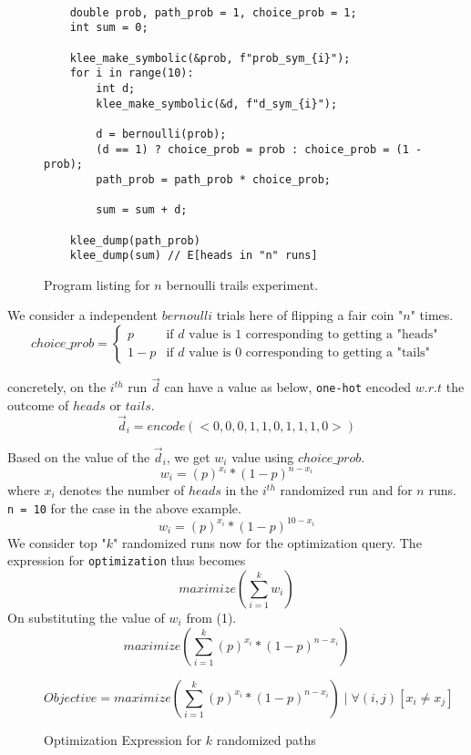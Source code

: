 \documentclass[usenames,dvipsnames,acmsmall]{acmart}
\begin{document}
	\begin{figure}
		\begin{verbatim}
	
	double prob, path_prob = 1, choice_prob = 1;
	int sum = 0;
	
	klee_make_symbolic(&prob, f"prob_sym_{i}");
	for i in range(10):
		int d;
		klee_make_symbolic(&d, f"d_sym_{i}");
	
		d = bernoulli(prob);
		(d == 1) ? choice_prob = prob : choice_prob = (1 - prob);
		path_prob = path_prob * choice_prob;
		
		sum = sum + d;
		
	klee_dump(path_prob)
	klee_dump(sum) // E[heads in "n" runs] 
		\end{verbatim}
		\caption{Program listing for $n$ bernoulli trails experiment.}
	\end{figure}

We consider a independent $bernoulli$ trials here of flipping a fair coin "$n$" times. 
\[ 
{choice\_prob} = 
\begin{cases} 
	p & \textrm{if $d$ value is 1 corresponding to getting a "heads"} \\
	1-p & \textrm{if $d$ value is 0 corresponding to getting a "tails"}
\end{cases}
\]

concretely, on the $i^{th}$ run \texttt{$\vec{d}$} can have a value as below, \texttt{one-hot} encoded $w.r.t$ the outcome of $heads$ or $tails$.
\[
\vec{d}_{i} = encode(<0,0,0,1,1,0,1,1,1,0>)
\]

Based on the value of the $\vec{d}_{i}$, we get $w_{i}$ value using $choice\_prob$. 
\begin{equation}
	w_{i} = {(p)^{x_i} * (1-p)^{n-x_i}}
\end{equation}
where $x_i$ denotes the number of $heads$ in the $i^{th}$ randomized run and for $n$ runs. \texttt{n = 10} for the case in the above example. \\
\begin{equation}
	w_{i} = {(p)^{x_i} * (1-p)^{10-x_i}}
\end{equation}
We consider top "$k$" randomized runs now for the optimization query. The expression for \texttt{optimization} thus becomes 
\[	
	maximize(\sum_{i=1}^{k}{w_i})
\]
On substituting the value of $w_i$ from (1).
\begin{equation}	
	maximize(\sum_{i=1}^{k}{(p)^{x_i} * (1-p)^{n-x_i}})
\end{equation}

\begin{figure}
	\begin{equation}	
		Objective = maximize(\sum_{i=1}^{k}{(p)^{x_i} * (1-p)^{n-x_i}}) \mid \forall (i, j) [{x_i} \neq {x_j}]
	\end{equation}
	\caption{Optimization Expression for $k$ randomized paths}
	\label{eq:optimization-1}
\end{figure}
\end{document}
